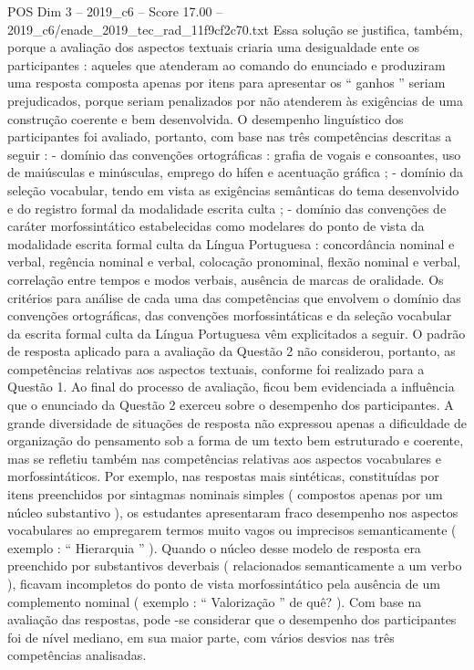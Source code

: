 \begin{textsample}{POS Dim 3 – 2019\_c6 – Score 17.00 – 2019\_c6/enade\_2019\_tec\_rad\_11f9cf2c70.txt}
Essa solução se justifica, também, porque a avaliação dos aspectos textuais criaria uma desigualdade ente os participantes : aqueles que atenderam ao comando do enunciado e produziram uma resposta composta apenas por itens para apresentar os “ ganhos ” seriam prejudicados, porque seriam penalizados por não atenderem às exigências de uma construção coerente e bem desenvolvida.
O desempenho linguístico dos participantes foi avaliado, portanto, com base nas três competências descritas a seguir : - domínio das convenções ortográficas : grafia de vogais e consoantes, uso de maiúsculas e minúsculas, emprego do hífen e acentuação gráfica ; - domínio da seleção vocabular, tendo em vista as exigências semânticas do tema desenvolvido e do registro formal da modalidade escrita culta ; - domínio das convenções de caráter morfossintático estabelecidas como modelares do ponto de vista da modalidade escrita formal culta da Língua Portuguesa : concordância nominal e verbal, regência nominal e verbal, colocação pronominal, flexão nominal e verbal, correlação entre tempos e modos verbais, ausência de marcas de oralidade.
Os critérios para análise de cada uma das competências que envolvem o domínio das convenções ortográficas, das convenções morfossintáticas e da seleção vocabular da escrita formal culta da Língua Portuguesa vêm explicitados a seguir.
O padrão de resposta aplicado para a avaliação da Questão 2 não considerou, portanto, as competências relativas aos aspectos textuais, conforme foi realizado para a Questão 1.
Ao final do processo de avaliação, ficou bem evidenciada a influência que o enunciado da Questão 2 exerceu sobre o desempenho dos participantes.
A grande diversidade de situações de resposta não expressou apenas a dificuldade de organização do pensamento sob a forma de um texto bem estruturado e coerente, mas se refletiu também nas competências relativas aos aspectos vocabulares e morfossintáticos.
Por exemplo, nas respostas mais sintéticas, constituídas por itens preenchidos por sintagmas nominais simples ( compostos apenas por um núcleo substantivo ), os estudantes apresentaram fraco desempenho nos aspectos vocabulares ao empregarem termos muito vagos ou imprecisos semanticamente ( exemplo : “ Hierarquia ” ).
Quando o núcleo desse modelo de resposta era preenchido por substantivos deverbais ( relacionados semanticamente a um verbo ), ficavam incompletos do ponto de vista morfossintático pela ausência de um complemento nominal ( exemplo : “ Valorização ” de quê? ).
Com base na avaliação das respostas, pode -se considerar que o desempenho dos participantes foi de nível mediano, em sua maior parte, com vários desvios nas três competências analisadas.

\end{textsample}
